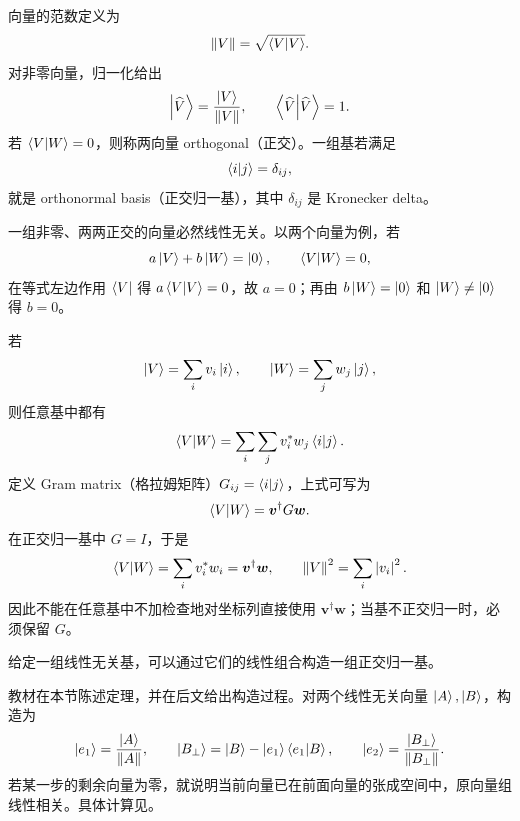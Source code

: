 
向量的范数定义为
\begin{equation}
  \left\lVert V \right\rVert=\sqrt{\left\langle V \middle| V \right\rangle}.
  \label{eq:QM-C01-S02-norm}
\end{equation}
对非零向量，归一化给出
\[
  \left|\widehat V\right\rangle=\frac{\left|V\right\rangle}{\left\lVert V \right\rVert},
  \qquad \left\langle \widehat V \middle| \widehat V \right\rangle=1.
\]
若 $\left\langle V \middle| W \right\rangle=0$，则称两向量 orthogonal（正交）。一组基若满足
\begin{equation}
  \left\langle i \middle| j \right\rangle=\delta_{ij},
  \label{eq:QM-C01-S02-orthonormal-basis}
\end{equation}
就是 orthonormal basis（正交归一基），其中 $\delta_{ij}$ 是 Kronecker delta。

一组非零、两两正交的向量必然线性无关。以两个向量为例，若
\[
  a\left|V\right\rangle+b\left|W\right\rangle=\left|0\right\rangle,
  \qquad \left\langle V \middle| W \right\rangle=0,
\]
在等式左边作用 $\left\langle V\right|$ 得 $a\left\langle V \middle| V \right\rangle=0$，故 $a=0$；再由 $b\left|W\right\rangle=\left|0\right\rangle$ 和 $\left|W\right\rangle\neq\left|0\right\rangle$ 得 $b=0$。


若
\[
  \left|V\right\rangle=\sum_i v_i\left|i\right\rangle,
  \qquad
  \left|W\right\rangle=\sum_j w_j\left|j\right\rangle,
\]
则任意基中都有
\begin{equation}
  \left\langle V \middle| W \right\rangle
  =\sum_i\sum_j v_i^*w_j\left\langle i \middle| j \right\rangle.
  \label{eq:QM-C01-S02-general-basis-inner-product}
\end{equation}
定义 Gram matrix（格拉姆矩阵）$G_{ij}=\left\langle i \middle| j \right\rangle$，上式可写为
\[
  \left\langle V \middle| W \right\rangle=\bm v^\dagger G\bm w.
\]
在正交归一基中 $G=I$，于是
\begin{equation}
  \left\langle V \middle| W \right\rangle=\sum_i v_i^*w_i
  =\bm v^\dagger\bm w,
  \qquad
  \left\lVert V \right\rVert^2=\sum_i\left|v_i\right|^2.
  \label{eq:QM-C01-S02-orthonormal-components}
\end{equation}
因此不能在任意基中不加检查地对坐标列直接使用 $\bm v^\dagger\bm w$；当基不正交归一时，必须保留 $G$。


\begin{theorem}
给定一组线性无关基，可以通过它们的线性组合构造一组正交归一基。
\end{theorem}

教材在本节陈述定理，并在后文给出构造过程。对两个线性无关向量 $\left|A\right\rangle,\left|B\right\rangle$，构造为
\[
  \left|e_1\right\rangle=\frac{\left|A\right\rangle}{\left\lVert A \right\rVert},
  \qquad
  \left|B_\perp\right\rangle=\left|B\right\rangle-\left|e_1\right\rangle\left\langle e_1 \middle| B \right\rangle,
  \qquad
  \left|e_2\right\rangle=\frac{\left|B_\perp\right\rangle}{\left\lVert B_\perp \right\rVert}.
\]
若某一步的剩余向量为零，就说明当前向量已在前面向量的张成空间中，原向量组线性相关。具体计算见。

